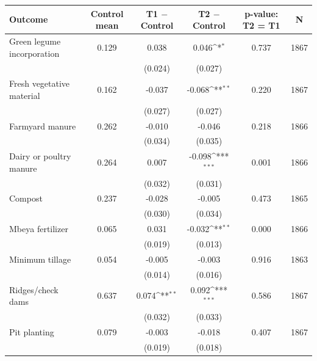 {
\def\sym#1{\ifmmode^{#1}\else\(^{#1}\)\fi}
\begin{tabular}{lccccc}
\hline\hline
Outcome & Control mean & T1 $-$ Control & T2 $-$ Control & p-value: T2 = T1 & N \\
\hline
Green legume incorporation & 0.129 & 0.038 & 0.046\sym{*} & 0.737 & 1867 \\
& & (0.024) & (0.027) & & \\
Fresh vegetative material & 0.162 & -0.037 & -0.068\sym{**} & 0.220 & 1867 \\
& & (0.027) & (0.027) & & \\
Farmyard manure & 0.262 & -0.010 & -0.046 & 0.218 & 1866 \\
& & (0.034) & (0.035) & & \\
Dairy or poultry manure & 0.264 & 0.007 & -0.098\sym{***} & 0.001 & 1866 \\
& & (0.032) & (0.031) & & \\
Compost & 0.237 & -0.028 & -0.005 & 0.473 & 1865 \\
& & (0.030) & (0.034) & & \\
Mbeya fertilizer & 0.065 & 0.031 & -0.032\sym{**} & 0.000 & 1866 \\
& & (0.019) & (0.013) & & \\
Minimum tillage & 0.054 & -0.005 & -0.003 & 0.916 & 1863 \\
& & (0.014) & (0.016) & & \\
Ridges/check dams & 0.637 & 0.074\sym{**} & 0.092\sym{***} & 0.586 & 1867 \\
& & (0.032) & (0.033) & & \\
Pit planting & 0.079 & -0.003 & -0.018 & 0.407 & 1867 \\
& & (0.019) & (0.018) & & \\
\hline\hline
\end{tabular}
}
